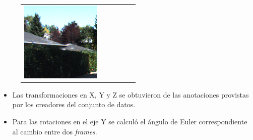\documentclass{beamer}
\begin{document}
\begin{frame}
\begin{figure}
{\begin{tabular}{cccccc}
\includegraphics[width = 1.5in]{./images/kitti/c1.png}\\
\end{tabular}
}
\label{fig:kitti-sample}
\end{figure}
\begin{itemize}
    \item Las transformaciones en X, Y y Z se obtuvieron de las anotaciones provistas por los creadores del conjunto de datos.
    \item Para las rotaciones en el eje Y se calculó el ángulo de Euler correspondiente al cambio entre dos \textit{frames}.
\end{itemize}
\end{frame}
\end{document}
